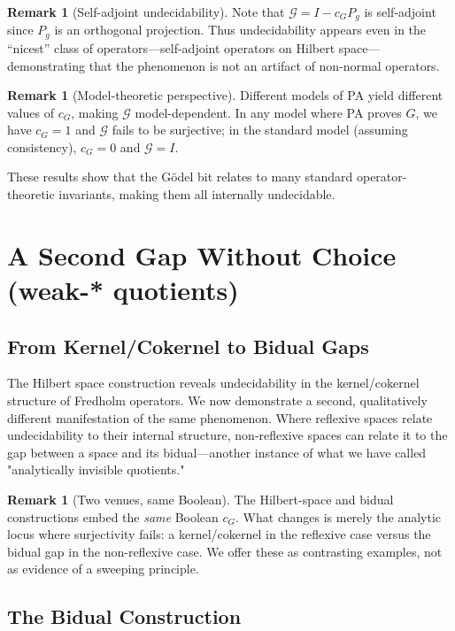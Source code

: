\documentclass[11pt]{article}
\theoremstyle{definition}
\newtheorem{remark}[theorem]{Remark}
\begin{document}
\begin{remark}[Self-adjoint undecidability]
Note that $\mathcal{G} = I - c_G P_g$ is self-adjoint since $P_g$ is an orthogonal projection. Thus undecidability appears even in the ``nicest'' class of operators---self-adjoint operators on Hilbert space---demonstrating that the phenomenon is not an artifact of non-normal operators.
\end{remark}

\begin{remark}[Model-theoretic perspective]
Different models of PA yield different values of $c_G$, making $\mathcal{G}$ model-dependent. In any model where PA proves $G$, we have $c_G = 1$ and $\mathcal{G}$ fails to be surjective; in the standard model (assuming consistency), $c_G = 0$ and $\mathcal{G} = I$.
\end{remark}

These results show that the Gödel bit relates to many standard operator-theoretic invariants, making them all internally undecidable.

\section{A Second Gap Without Choice (weak-* quotients)}

\subsection{From Kernel/Cokernel to Bidual Gaps}

The Hilbert space construction reveals undecidability in the kernel/cokernel structure of Fredholm operators. We now demonstrate a second, qualitatively different manifestation of the same phenomenon. Where reflexive spaces relate undecidability to their internal structure, non-reflexive spaces can relate it to the gap between a space and its bidual---another instance of what we have called "analytically invisible quotients."

\begin{remark}[Two venues, same Boolean]
The Hilbert-space and bidual constructions embed the \emph{same}
Boolean $c_G$.  What changes is merely the analytic locus where
surjectivity fails: a kernel/cokernel in the reflexive case versus the
bidual gap in the non-reflexive case.  We offer these as contrasting
examples, not as evidence of a sweeping principle.
\end{remark}

\subsection{The Bidual Construction}
\end{document}

